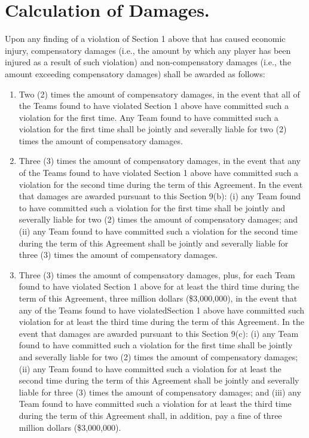 \documentclass[
]{book}
\providecommand{\tightlist}{%
  \setlength{\itemsep}{0pt}\setlength{\parskip}{0pt}}
\begin{document}
\hypertarget{calculation-of-damages.}{%
\section{Calculation of Damages.}\label{calculation-of-damages.}}

Upon any finding of a violation of Section 1 above that has caused economic injury, compensatory damages (i.e., the amount by which any player has been injured as a result of such violation) and non-compensatory damages (i.e., the amount exceeding compensatory damages) shall be awarded as follows:

\begin{enumerate}
\def\labelenumi{(\alph{enumi})}
\tightlist
\item
  Two (2) times the amount of compensatory damages, in the event that all of the Teams found to have violated Section 1 above have committed such a violation for the first time. Any Team found to have committed such a violation for the first time shall be jointly and severally liable for two (2) times the amount of compensatory damages.
\item
  Three (3) times the amount of compensatory damages, in the event that any of the Teams found to have violated Section 1 above have committed such a violation for the second time during the term of this Agreement. In the event that damages are awarded pursuant to this Section 9(b): (i) any Team found to have committed such a violation for the first time shall be jointly and severally liable for two (2) times the amount of compensatory damages; and (ii) any Team found to have committed such a violation for the second time during the term of this Agreement shall be jointly and severally liable for three (3) times the amount of compensatory damages.
\item
  Three (3) times the amount of compensatory damages, plus, for each Team found to have violated Section 1 above for at least the third time during the term of this Agreement, three million dollars (\$3,000,000), in the event that any of the Teams found to have violatedSection 1 above have committed such violation for at least the third time during the term of this Agreement. In the event that damages are awarded pursuant to this Section 9(c): (i) any Team found to have committed such a violation for the first time shall be jointly and severally liable for two (2) times the amount of compensatory damages; (ii) any Team found to have committed such a violation for at least the second time during the term of this Agreement shall be jointly and severally liable for three (3) times the amount of compensatory damages; and (iii) any Team found to have committed such a violation for at least the third time during the term of this Agreement shall, in addition, pay a fine of three million dollars (\$3,000,000).
\end{enumerate}
\end{document}
